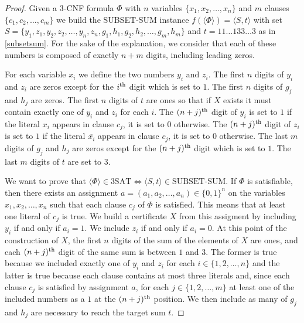 \begin{proof}
	Given a 3-CNF formula \(\Phi\) with \(n\) variables
	\(\{x_1,x_2,\ldots,x_n\}\) and \(m\) clauses \(\{c_1,c_2,\ldots,c_m\}\)
	we build the SUBSET-SUM instance \(f(\langle \Phi \rangle) = \langle
	S,t\rangle\) with set \(S =
	\{y_1,z_1,y_2,z_2,\ldots,y_n,z_n,g_1,h_1,g_2,h_2,\ldots,g_m,h_m\}\) and
	\(t = 11\ldots133\ldots3\) as in
	\ref{subsetsum}. For the sake of the explanation, we consider that each of
	these numbers is composed of exactly \(n+m\) digits, including leading
	zeros.

	For each variable \(x_i\) we define the two numbers
	\(y_i\) and \(z_i\). The first \(n\) digits of \(y_i\) and \(z_i\) are
	zeros except for the \(i^{\text{th}}\) digit which is set to \(1\). The first
	\(n\) digits of \(g_j\) and \(h_j\) are zeros. The first
	\(n\) digits of \(t\) are ones so that if \(X\) exists it must contain
	exactly one of \(y_i\) and \(z_i\) for each \(i\).
	The \((n+j)^{\text{th}}\) digit of \(y_i\) is set to \(1\) if the literal \(x_i\)
	appears in clause \(c_j\), it is set to \(0\) otherwise.
	The \((n+j)^{\text{th}}\) digit of \(z_i\) is set to \(1\) if the literal
	\(\overline{x_i}\)
	appears in clause \(c_j\), it is set to \(0\) otherwise. The last \(m\)
	digits of \(g_j\) and \(h_j\) are zeros except for the \((n+j)^{\text{th}}\) digit
	which is set to \(1\). The last \(m\) digits of \(t\) are set to \(3\).

	We want to prove that \(\langle \Phi \rangle \in \text{3SAT} \iff \langle
	S,t\rangle \in \text{SUBSET-SUM}\).
	If \(\Phi\) is satisfiable, then there
	exists an assignment \(a = (a_1, a_2,\ldots,a_n) \in \{0,1\}^n\) on the
	variables \(x_1,x_2,\ldots,x_n\) such that each clause \(c_j\) of \(\Phi\)
	is satisfied. This means that at least one literal of \(c_j\) is true. We
	build a certificate \(X\) from this assigment by including \(y_i\) if and
	only if \(a_i = 1\). We include \(z_i\) if and only if \(a_i = 0\).
	At this point of the construction of \(X\), the first \(n\) digits of the
	sum of the elements of \(X\) are ones, and each \((n+j)^{\text{th}}\) digit of
	the same sum is between \(1\) and \(3\). The former is true because we
	included exactly one of \(y_i\) and \(z_i\) for each \(i \in
	\{1,2,\ldots,n\}\) and the latter is true because each clause contains at
	most three literals and, since each clause \(c_j\) is satisfied by
	assignment \(a\), for each \(j \in \{1,2,\ldots,m\}\) at least one of the
	included numbers as a \(1\) at the \((n+j)^{\text{th}}\) position.
	We then include as many of \(g_j\) and \(h_j\) are necessary to reach the
	target sum \(t\).


\end{proof}

